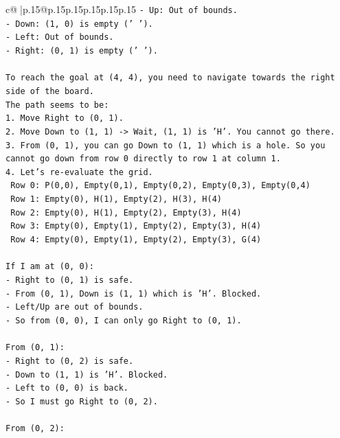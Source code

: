 \documentclass{article}
\begin{document}
{\begin{supertabular}{c@{$\;$}|p{.15\linewidth}@{}p{.15\linewidth}p{.15\linewidth}p{.15\linewidth}p{.15\linewidth}p{.15\linewidth}}
{{{\texttt{{-} Up: Out of bounds.} \\
\texttt{{-} Down: (1, 0) is empty (' ').} \\
\texttt{{-} Left: Out of bounds.} \\
\texttt{{-} Right: (0, 1) is empty (' ').} \\
\\ 
\texttt{To reach the goal at (4, 4), you need to navigate towards the right side of the board.} \\
\texttt{The path seems to be:} \\
\texttt{1. Move Right to (0, 1).} \\
\texttt{2. Move Down to (1, 1) {-}> Wait, (1, 1) is 'H'. You cannot go there.} \\
\texttt{3. From (0, 1), you can go Down to (1, 1) which is a hole. So you cannot go down from row 0 directly to row 1 at column 1.} \\
\texttt{4. Let's re{-}evaluate the grid.} \\
\texttt{   Row 0: P(0,0), Empty(0,1), Empty(0,2), Empty(0,3), Empty(0,4)} \\
\texttt{   Row 1: Empty(0), H(1), Empty(2), H(3), H(4)} \\
\texttt{   Row 2: Empty(0), H(1), Empty(2), Empty(3), H(4)} \\
\texttt{   Row 3: Empty(0), Empty(1), Empty(2), Empty(3), H(4)} \\
\texttt{   Row 4: Empty(0), Empty(1), Empty(2), Empty(3), G(4)} \\
\\ 
\texttt{If I am at (0, 0):} \\
\texttt{{-} Right to (0, 1) is safe.} \\
\texttt{{-} From (0, 1), Down is (1, 1) which is 'H'. Blocked.} \\
\texttt{{-} Left/Up are out of bounds.} \\
\texttt{{-} So from (0, 0), I can only go Right to (0, 1).} \\
\\ 
\texttt{From (0, 1):} \\
\texttt{{-} Right to (0, 2) is safe.} \\
\texttt{{-} Down to (1, 1) is 'H'. Blocked.} \\
\texttt{{-} Left to (0, 0) is back.} \\
\texttt{{-} So I must go Right to (0, 2).} \\
\\ 
\texttt{From (0, 2):} \\
}}}
\end{supertabular}}
\end{document}
